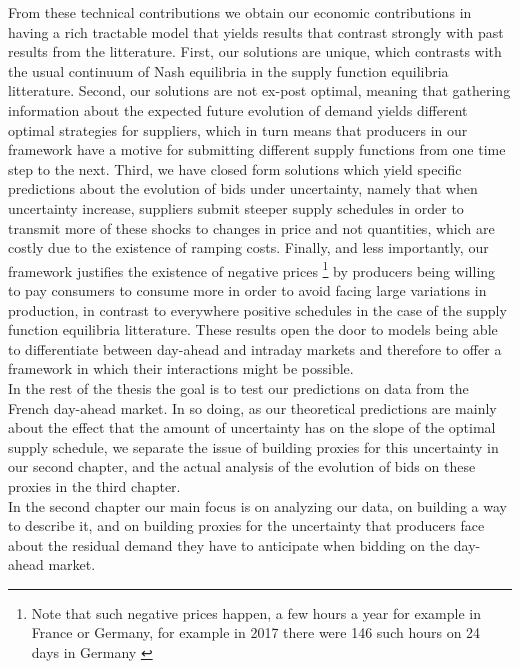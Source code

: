 From these technical contributions we obtain our economic contributions in having a rich tractable model that yields results that contrast strongly with past results from the litterature. First, our solutions are unique, which contrasts with the usual continuum of Nash equilibria in the supply function equilibria litterature. Second, our solutions are not ex-post optimal, meaning that gathering information about the expected future evolution of demand yields different optimal strategies for suppliers, which in turn means that producers in our framework have a motive for submitting different supply functions from one time step to the next. Third, we have closed form solutions which yield specific predictions about the evolution of bids under uncertainty, namely that when uncertainty increase, suppliers submit steeper supply schedules in order to transmit more of these shocks to changes in price and not quantities, which are costly due to the existence of ramping costs. Finally, and less importantly, our framework justifies the existence of negative prices \footnote{Note that such negative prices happen, a few hours a year for example in France or Germany, for example in 2017 there were 146 such hours on 24 days in Germany \cite{epexnegP}} by producers being willing to pay consumers to consume more in order to avoid facing large variations in production, in contrast to everywhere positive schedules in the case of the supply function equilibria litterature. These results open the door to models being able to differentiate between day-ahead and intraday markets and therefore to offer a framework in which their interactions might be possible.\\

In the rest of the thesis the goal is to test our predictions on data from the French day-ahead market. In so doing, as our theoretical predictions are mainly about the effect that the amount of uncertainty has on the slope of the optimal supply schedule, we separate the issue of building proxies for this uncertainty in our second chapter, and the actual analysis of the evolution of bids on these proxies in the third chapter.\\

In the second chapter our main focus is on analyzing our data, on building a way to describe it, and on building proxies for the uncertainty that producers face about the residual demand they have to anticipate when bidding on the day-ahead market. \\


